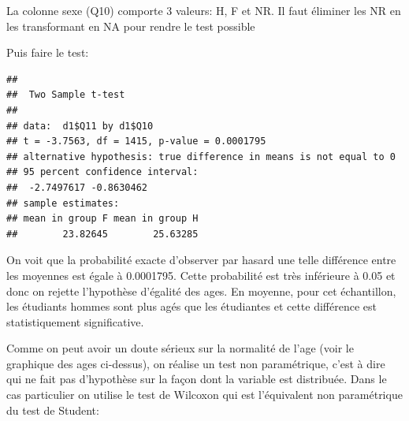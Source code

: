 \documentclass[]{article}
\newenvironment{Shaded}{\begin{snugshade}}{\end{snugshade}}
\newcommand{\KeywordTok}[1]{\textcolor[rgb]{0.13,0.29,0.53}{\textbf{{#1}}}}
\newcommand{\DataTypeTok}[1]{\textcolor[rgb]{0.13,0.29,0.53}{{#1}}}
\newcommand{\StringTok}[1]{\textcolor[rgb]{0.31,0.60,0.02}{{#1}}}
\newcommand{\OtherTok}[1]{\textcolor[rgb]{0.56,0.35,0.01}{{#1}}}
\newcommand{\NormalTok}[1]{{#1}}
\begin{document}
La colonne sexe (Q10) comporte 3 valeurs: H, F et NR. Il faut éliminer
les NR en les transformant en NA pour rendre le test possible

\begin{Shaded}
\end{Shaded}

Puis faire le test:

\begin{Shaded}
\end{Shaded}

\begin{verbatim}
## 
##  Two Sample t-test
## 
## data:  d1$Q11 by d1$Q10
## t = -3.7563, df = 1415, p-value = 0.0001795
## alternative hypothesis: true difference in means is not equal to 0
## 95 percent confidence interval:
##  -2.7497617 -0.8630462
## sample estimates:
## mean in group F mean in group H 
##        23.82645        25.63285
\end{verbatim}

\begin{Shaded}
\end{Shaded}

On voit que la probabilité exacte d'observer par hasard une telle
différence entre les moyennes est égale à 0.0001795. Cette probabilité
est très inférieure à 0.05 et donc on rejette l'hypothèse d'égalité des
ages. En moyenne, pour cet échantillon, les étudiants hommes sont plus
agés que les étudiantes et cette différence est statistiquement
significative.

Comme on peut avoir un doute sérieux sur la normalité de l'age (voir le
graphique des ages ci-dessus), on réalise un test non paramétrique,
c'est à dire qui ne fait pas d'hypothèse sur la façon dont la variable
est distribuée. Dans le cas particulier on utilise le test de Wilcoxon
qui est l'équivalent non paramétrique du test de Student:
\end{document}
